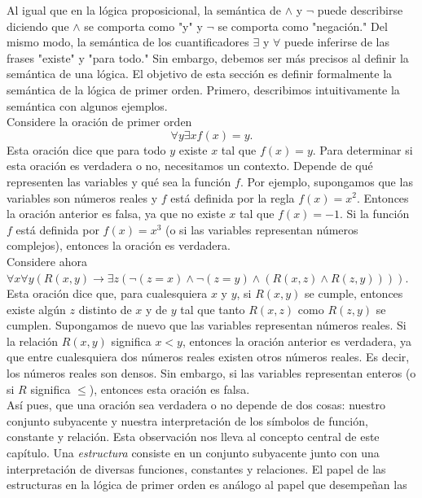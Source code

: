 \documentclass[12pt,a4paper]{book}
\newcommand{\comillas}[1]{"#1"}
\begin{document}
    Al igual que en la lógica proposicional, la semántica de $\wedge$ y $\neg$ puede describirse diciendo que $\wedge$ se
    comporta como \comillas{y} y $\neg$ se comporta como \comillas{negación.} Del mismo modo, la semántica de los
    cuantificadores $\exists$ y $\forall$ puede inferirse de las frases \comillas{existe} y \comillas{para todo.} Sin
    embargo, debemos ser más precisos al definir la semántica de una lógica. El objetivo de esta sección es definir
    formalmente la semántica de la lógica de primer orden. Primero, describimos intuitivamente la semántica con algunos
    ejemplos.\\
    Considere la oración de primer orden
    \begin{equation*}
        \forall y\exists xf(x)=y.
    \end{equation*}
    Esta oración dice que para todo $y$ existe $x$ tal que $f(x)=y$. Para determinar si esta oración es verdadera o no,
    necesitamos un contexto. Depende de qué representen las variables y qué sea la función $f$. Por ejemplo, supongamos que
    las variables son números reales y $f$ está definida por la regla $f(x)=x^{2}$. Entonces la oración anterior es falsa,
    ya que no existe $x$ tal que $f(x)=-1$. Si la función $f$ está definida por $f(x)=x^{3}$ (o si las variables representan
    números complejos), entonces la oración es verdadera.\\
    Considere ahora $\forall x\forall y(R(x,y)\rightarrow\exists z(\neg(z=x)\wedge\neg(z=y)\wedge(R(x,z)\wedge R(z,y))))$.
    Esta oración dice que, para cualesquiera $x$ y $y$, si $R(x,y)$ se cumple, entonces existe algún $z$ distinto de $x$ y
    de $y$ tal que tanto $R(x,z)$ como $R(z,y)$ se cumplen. Supongamos de nuevo que las variables representan números
    reales. Si la relación $R(x,y)$ significa $x<y$, entonces la oración anterior es verdadera, ya que entre cualesquiera
    dos números reales existen otros números reales. Es decir, los números reales son densos. Sin embargo, si las variables
    representan enteros (o si $R$ significa $\leq$), entonces esta oración es falsa.\\
    Así pues, que una oración sea verdadera o no depende de dos cosas: nuestro conjunto subyacente y nuestra
    interpretación de los símbolos de función, constante y relación. Esta observación nos lleva al concepto central de este
    capítulo. Una \textit{estructura} consiste en un conjunto subyacente junto con una interpretación de diversas funciones,
    constantes y relaciones. El papel de las estructuras en la lógica de primer orden es análogo al papel que desempeñan las
\end{document}
